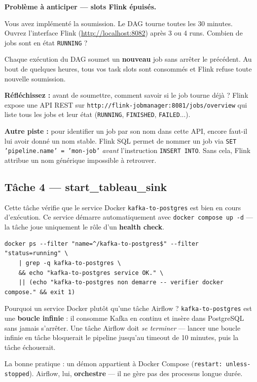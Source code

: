 \documentclass[12pt,a4paper]{article}
\begin{document}
\begin{warningbox}
  \textbf{Problème à anticiper --- slots Flink épuisés.}

  Vous avez implémenté la soumission. Le DAG tourne toutes les 30 minutes.
  Ouvrez l'interface Flink (\url{http://localhost:8082}) après 3 ou 4 runs.
  Combien de jobs sont en état \texttt{RUNNING} ?

  \medskip
  Chaque exécution du DAG soumet un \textbf{nouveau} job sans arrêter le précédent.
  Au bout de quelques heures, tous vos task slots sont consommés et Flink refuse
  toute nouvelle soumission.

  \medskip
  \textbf{Réfléchissez :} avant de soumettre, comment savoir si le job tourne déjà ?
  Flink expose une API REST sur \texttt{http://flink-jobmanager:8081/jobs/overview}
  qui liste tous les jobs et leur état (\texttt{RUNNING}, \texttt{FINISHED}, \texttt{FAILED}...).

  \medskip
  \textbf{Autre piste :} pour identifier un job par son nom dans cette API,
  encore faut-il lui avoir donné un nom stable. Flink SQL permet de nommer
  un job via \texttt{SET 'pipeline.name' = 'mon-job'} \emph{avant} l'instruction
  \texttt{INSERT INTO}. Sans cela, Flink attribue un nom générique impossible à retrouver.
\end{warningbox}

\subsection{Tâche 4 --- start\_tableau\_sink}

Cette tâche vérifie que le service Docker \texttt{kafka-to-postgres} est bien en cours
d'exécution. Ce service démarre automatiquement avec \texttt{docker compose up -d} ---
la tâche joue uniquement le rôle d'un \textbf{health check}.

\begin{lstlisting}[style=bash, caption={Vérification du service kafka-to-postgres}]
docker ps --filter "name=^/kafka-to-postgres$" --filter "status=running" \
    | grep -q kafka-to-postgres \
    && echo "kafka-to-postgres service OK." \
    || (echo "kafka-to-postgres non demarre -- verifier docker compose." && exit 1)
\end{lstlisting}

\begin{conceptbox}{Pourquoi un service Docker plutôt qu'une tâche Airflow ?}
  \texttt{kafka-to-postgres} est une \textbf{boucle infinie} : il consomme Kafka en continu
  et insère dans PostgreSQL sans jamais s'arrêter.
  Une tâche Airflow doit \emph{se terminer} --- lancer une boucle infinie en tâche
  bloquerait le pipeline jusqu'au timeout de 10 minutes, puis la tâche échouerait.

  \medskip
  La bonne pratique : un démon appartient à Docker Compose (\texttt{restart: unless-stopped}).
  Airflow, lui, \textbf{orchestre} --- il ne gère pas des processus longue durée.
\end{conceptbox}
\end{document}

